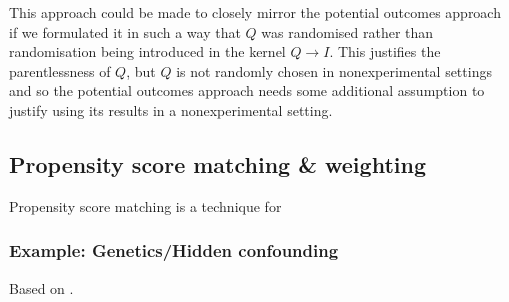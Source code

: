 This approach could be made to closely mirror the potential outcomes approach if we formulated it in such a way that $Q$ was randomised rather than randomisation being introduced in the kernel $Q\to I$. This justifies the parentlessness of $Q$, but $Q$ is not randomly chosen in nonexperimental settings and so the potential outcomes approach needs some additional assumption to justify using its results in a nonexperimental setting.


\subsection{Propensity score matching \& weighting}

Propensity score matching is a technique for 


\subsubsection{Example: Genetics/Hidden confounding}

Based on \cite{ranganath_multiple_2018}.

